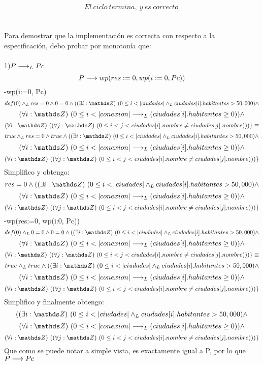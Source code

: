 \documentclass[10pt,a4paper]{article}
\begin{document}
\[El \ ciclo\ termina ,\ y\ es\ correcto\ \]\\
\\
Para demostrar que la implementación es correcta con respecto a la especificación, debo probar por monotonía que:\\ \\
1)$ P\longrightarrow _L Pc$\\ \hspace{0.5cm}
\[P \longrightarrow wp(res:=0, wp(i:=0, Pc))\]
-wp(i:=0, Pc)
\[def(0) \yLuego  res = 0 \land 0 = 0 \land (\existe[unalinea]i\ent {0\leq i<|ciudades| \yLuego ciudades[i].habitantes > 50,000} \land \]  \[ \paraTodo[unalinea]i{\ent}{0 \leq i<|conexion|  \implicaLuego  (ciudades[i].habitantes \geq 0) } \land \] \[
    \paraTodo[unalinea]i{\ent}{\paraTodo[unalinea]j{\ent}{0 \leq i  < j<ciudades[i].nombre \neq ciudades[j].nombre}})\}  \equiv \]
\[true \yLuego  res = 0 \land true \land (\existe[unalinea]i\ent {0\leq i<|ciudades| \yLuego ciudades[i].habitantes > 50,000} \land \]  \[ \paraTodo[unalinea]i{\ent}{0 \leq i<|conexion|  \implicaLuego  (ciudades[i].habitantes \geq 0) } \land \] \[
    \paraTodo[unalinea]i{\ent}{\paraTodo[unalinea]j{\ent}{0 \leq i  < j<ciudades[i].nombre \neq ciudades[j].nombre}})\}  \]
Simplifico y obtengo:
\[  res = 0  \land (\existe[unalinea]i\ent {0\leq i<|ciudades| \yLuego ciudades[i].habitantes > 50,000} \land \]  \[ \paraTodo[unalinea]i{\ent}{0 \leq i<|conexion|  \implicaLuego  (ciudades[i].habitantes \geq 0) } \land \] \[
    \paraTodo[unalinea]i{\ent}{\paraTodo[unalinea]j{\ent}{0 \leq i  < j<ciudades[i].nombre \neq ciudades[j].nombre}})\}  \]
-wp(res:=0, wp(i:0, Pc))
\[def(0) \yLuego  0 = 0 \land 0 = 0 \land (\existe[unalinea]i\ent {0\leq i<|ciudades| \yLuego ciudades[i].habitantes > 50,000} \land \]  \[ \paraTodo[unalinea]i{\ent}{0 \leq i<|conexion|  \implicaLuego  (ciudades[i].habitantes \geq 0) } \land \] \[
    \paraTodo[unalinea]i{\ent}{\paraTodo[unalinea]j{\ent}{0 \leq i  < j<ciudades[i].nombre \neq ciudades[j].nombre}})\}  \equiv \]
\[true \yLuego  true  \land (\existe[unalinea]i\ent {0\leq i<|ciudades| \yLuego ciudades[i].habitantes > 50,000} \land \]  \[ \paraTodo[unalinea]i{\ent}{0 \leq i<|conexion|  \implicaLuego  (ciudades[i].habitantes \geq 0) } \land \] \[
    \paraTodo[unalinea]i{\ent}{\paraTodo[unalinea]j{\ent}{0 \leq i  < j<ciudades[i].nombre \neq ciudades[j].nombre}})\}  \]
Simplifico y finalmente obtengo:
\[(\existe[unalinea]i\ent {0\leq i<|ciudades| \yLuego ciudades[i].habitantes > 50,000} \land \]  \[ \paraTodo[unalinea]i{\ent}{0 \leq i<|conexion|  \implicaLuego  (ciudades[i].habitantes \geq 0) } \land \] \[
    \paraTodo[unalinea]i{\ent}{\paraTodo[unalinea]j{\ent}{0 \leq i  < j<ciudades[i].nombre \neq ciudades[j].nombre}})\}  \]
Que como se puede notar a simple vista, es exactamente igual a P, por lo que $P \longrightarrow Pc$  \\
\end{document}
